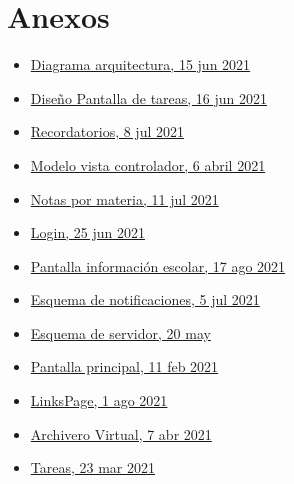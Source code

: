 \documentclass[10pt]{article}
\begin{document}
\section{Anexos}
\begin{itemize}
    \item \href{https://drive.google.com/file/d/15KZvm6CIDkM9g0DKMy8wb9b2fiIv2ROG/view?usp=sharing}
    {Diagrama arquitectura,  15 jun 2021}
    \item \href{https://drive.google.com/file/d/1LhLRHHiWVeEFRqgwnUttkpgct9kEACTq/view?usp=sharing} {Diseño Pantalla de tareas,  16 jun 2021}
    \item \href{https://drive.google.com/file/d/1N4PZQ41kn7JNZdWo4EaobB4sipUvPd8S/view?usp=sharing}{Recordatorios, 8 jul 2021}
    \item \href{https://drive.google.com/file/d/1NR3xwahN6aiRnEtGttwPc7ubX188eRmh/view?usp=sharing}{Modelo vista controlador,  6 abril 2021}
    \item \href{https://drive.google.com/file/d/1OMvjYk0Nwr1IXoy3Gtce-1zTW5y6Ea2j/view?usp=sharing}{Notas por materia, 11 jul 2021}
    \item \href{https://drive.google.com/file/d/1UC7XmlBGHwrKTog4K-RgmHMUh44nNHE9/view?usp=sharing}{Login, 25 jun 2021}
    \item \href{https://drive.google.com/file/d/1dKLuDtAksGwQyNf9vmHAt3SzZTOF-dzH/view?usp=sharing}{Pantalla información escolar, 17 ago 2021}
    \item \href{https://drive.google.com/file/d/1f6cP91edCqel2Af6U4ORgZ19fTHvJkgj/view?usp=sharing}{Esquema de notificaciones,  5 jul 2021}
    \item \href{https://drive.google.com/file/d/1gRQ1DOsUV1Sh1PLnGl-oD76absCRSu9o/view?usp=sharing}
{Esquema de servidor,  20 may}
    \item \href{https://drive.google.com/file/d/1iKIqTDIi4M3aPXLC7cX7fYwQdsycTmLQ/view?usp=sharing}
{Pantalla principal,  11 feb 2021}
    \item \href{https://drive.google.com/file/d/1tSR0xFik_Uz0kGiwxsTpW4rQPAiCZbmC/view?usp=sharing}
    {LinksPage,  1 ago 2021}
    \item \href{https://drive.google.com/file/d/1wgIdhQ5l7WvCdJyJS8HcCM8C_K1TBXVj/view?usp=sharing}{Archivero Virtual,  7 abr 2021}
    \item \href{https://drive.google.com/file/d/1ymBzTNposUKI1SH6fAeV3bMEkRAF2EMk/view?usp=sharing}{Tareas,  23 mar 2021}
    

\par\vspace{\baselineskip}

\end{itemize}
\end{document}
